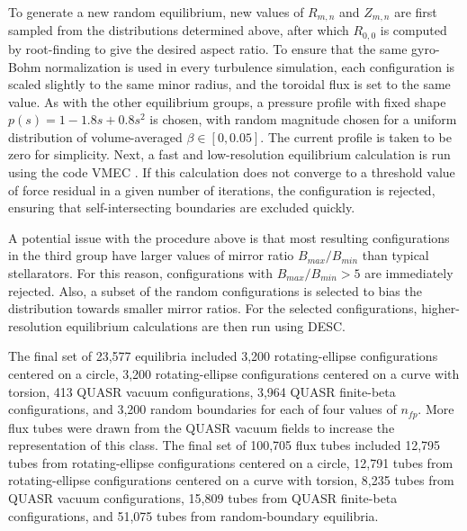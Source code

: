 \documentclass{jpp}
\begin{document}
To generate a new random equilibrium, new values of $R_{m,n}$ and $Z_{m,n}$ are first sampled from the distributions determined above, after which $R_{0,0}$ is computed by root-finding to give the desired aspect ratio.
To ensure that the same gyro-Bohm normalization is used in every turbulence simulation, each configuration is scaled slightly to the same minor radius, and the toroidal flux is set to the same value.
As with the other equilibrium groups, a pressure profile with fixed shape $p(s) = 1-1.8s+0.8 s^2$ is chosen, with random magnitude chosen for a uniform distribution of volume-averaged $\beta \in [0, 0.05]$.
The current profile is taken to be zero for simplicity.
Next, a fast and low-resolution equilibrium calculation is run using the code VMEC \citep{hirshman1983steepest}.
If this calculation does not converge to a threshold value of force residual in a given number of iterations, the configuration is rejected, ensuring that self-intersecting boundaries are excluded quickly.

A potential issue with the procedure above is that most resulting configurations in the third group have larger values of mirror ratio $B_{max} / B_{min}$ than typical stellarators.
For this reason, configurations with $B_{max} / B_{min} > 5$ are immediately rejected.
Also, a subset of the random configurations is selected to bias the distribution towards smaller mirror ratios.
For the selected configurations, higher-resolution equilibrium calculations are then run using DESC.

The final set of 23,577 equilibria included
3,200 rotating-ellipse configurations centered on a circle,
3,200 rotating-ellipse configurations centered on a curve with torsion,
413 QUASR vacuum configurations,
3,964 QUASR finite-beta configurations,
and 3,200 random boundaries for each of four values of $n_{fp}$.
More flux tubes were drawn from the QUASR vacuum fields to increase the representation of this class.
The final set of 100,705 flux tubes included
12,795 tubes from rotating-ellipse configurations centered on a circle,
12,791 tubes from rotating-ellipse configurations centered on a curve with torsion,
8,235 tubes from QUASR vacuum configurations,
15,809 tubes from QUASR finite-beta configurations,
and 51,075 tubes from random-boundary equilibria.

\end{document}
